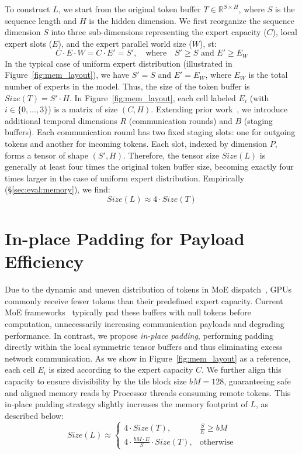 To construct $L$, we start from the original token buffer $T \in \mathbb{R}^{S \times H}$, where $S$ is the sequence length and $H$ is the hidden dimension. We first reorganize the sequence dimension $S$ into three sub-dimensions representing the expert capacity ($C$), local expert slots ($E$), and the expert parallel world size ($W$), st:
\[
    C \cdot E \cdot W = C \cdot E' = S', \quad\text{where}\quad S' \geq S \text{ and } E' \geq E_W
\]
In the typical case of uniform expert distribution (illustrated in Figure~\ref{fig:mem_layout}),
we have $S' = S$ and $E' = E_W$, where $E_W$ is the total number of experts in the model.
Thus, the size of the token buffer is $Size(T) = S' \cdot H$.
In Figure~\ref{fig:mem_layout}, each cell labeled $E_i$ (with $i \in \{0,\ldots,3\}$) is a matrix of size $(C, H)$.
Extending prior work~\cite{DBLP:conf/iclr/LepikhinLXCFHKS21, comet}, we introduce additional temporal dimensions $R$
(communication rounds) and $B$ (staging buffers).
Each communication round has two fixed staging slots:
one for outgoing tokens and another for incoming tokens.
Each slot, indexed by dimension $P$, forms a tensor of shape $(S', H)$.
Therefore, the tensor size $Size(L)$ is generally at least four times the original token buffer size,
becoming exactly four times larger in the case of uniform expert distribution.
Empirically (\S\ref{sec:eval:memory}), we find:
\[
    Size(L) \approx 4 \cdot Size(T)
\]
\section{In-place Padding for Payload Efficiency}\label{sec:payload}
Due to the dynamic and uneven distribution of tokens in MoE dispatch~\cite{bmamba},
GPUs commonly receive fewer tokens than their predefined expert capacity.
Current MoE frameworks~\cite{pmlr-v162-rajbhandari22a}
typically pad these buffers with null tokens before computation,
unnecessarily increasing communication payloads and degrading performance.
In contrast, we propose \emph{in-place padding},
performing padding directly within the local symmetric tensor buffers and
thus eliminating excess network communication.
As we show in Figure~\ref{fig:mem_layout} as a reference,
each cell $E_i$ is sized according to the expert capacity $C$.
We further align this capacity to ensure divisibility by the tile block size $bM = 128$,
guaranteeing safe and aligned memory reads by Processor threads consuming remote tokens.
This in-place padding strategy slightly increases the memory footprint of $L$, as described below:
\[
    Size(L) \approx \begin{cases}
                        4 \cdot Size(T), & \frac{S}{E} \geq bM \\[1ex]
                        4 \cdot \frac{bM \cdot E}{S} \cdot Size(T), & \text{otherwise}
    \end{cases}
\]